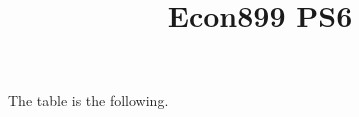 \documentclass{article}
\title{Econ899 PS6}
\begin{document}
\maketitle
The table is the following. 

\begin{center}

\end{center}
\end{document}
